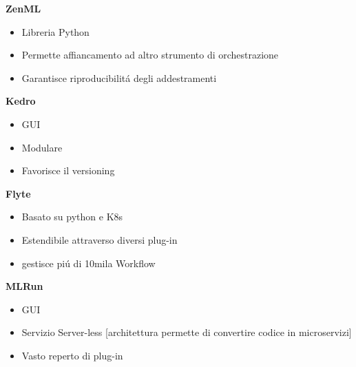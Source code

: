 \documentclass[xcolor=dvipsnames]{beamer}
\begin{document}
\begin{frame}
    \begin{minipage}{.40\textwidth}
        \textbf{ZenML}
        \begin{itemize}
            \item Libreria Python
            \item Permette affiancamento ad altro strumento di orchestrazione
            \item Garantisce riproducibilitá degli addestramenti
        \end{itemize}
  \end{minipage}
  \hfill
  \begin{minipage}{.40\textwidth}
    \textbf{Kedro}
    \begin{itemize}
        \item GUI
        \item Modulare
        \item Favorisce il versioning 
        \end{itemize}

\end{minipage}
\hfill
  \begin{minipage}{.40\textwidth}
\textbf{Flyte}
    \begin{itemize}
        \item Basato su python e K8s
        \item Estendibile attraverso diversi plug-in
        \item gestisce piú di 10mila Workflow
    \end{itemize}
\end{minipage}
\hfill
\begin{minipage}{.40\textwidth}
    \textbf{MLRun}
    \begin{itemize}
        \item GUI 
        \item Servizio Server-less [architettura permette di convertire codice in microservizi]
        \item Vasto reperto di plug-in
    \end{itemize}
    
\end{minipage}

\end{frame}
\end{document}
